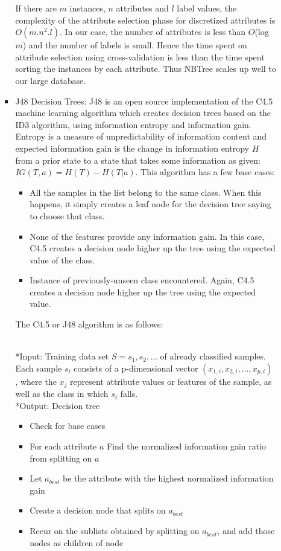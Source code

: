 \begin{itemize}
\begin{enumerate}
\begin{itemize}
If there are $m$ instances, $n$ attributes and $l$ label values, the complexity of the attribute selection phase for discretized attributes is $O(m.n^{2}.l)$. In our case, the number of attributes is less than $O$(log$m$) and the number of labels is small. Hence the time spent on attribute selection using cross-validation is less than the time spent sorting the instances by each attribute. Thus NBTree scales up well to our large database.
\vspace{2.5 mm}
\item{J48 Decision Trees: J48 is an open source implementation of the C4.5 machine learning algorithm which creates decision trees based on the ID3 algorithm, using information entropy and information gain. Entropy is a measure of unpredictability of information content and expected information gain is the change in information entropy $H$ from a prior state to a state that takes some information as given: $IG(T,a) = H(T) - H(T|a)$. This algorithm has a few base cases:
\begin{itemize}
\item{All the samples in the list belong to the same class. When this happens, it simply creates a leaf node for the decision tree saying to choose that class.}
\item{None of the features provide any information gain. In this case, C4.5 creates a decision node higher up the tree using the expected value of the class.}
\item{Instance of previously-unseen class encountered. Again, C4.5 creates a decision node higher up the tree using the expected value.}
\end{itemize} 
The C4.5 or J48 algorithm is as follows:}
\vspace{2.5 mm}
\\*Input: Training data set $S = {s_1, s_2, ...}$ of already classified samples. Each sample  $s_i$ consists of a p-dimensional vector $(x_{1,i}, x_{2,i}, ...,x_{p,i})$ , where the  $x_j$  represent attribute values or features of the sample, as well as the class in which  $s_i$  falls.
\\*Output: Decision tree
\vspace{0.1 mm}
\begin{itemize}
\item{Check for base cases}
\item{For each attribute $a$ Find the normalized information gain ratio from splitting on $a$}
\item{Let $a_{best}$ be the attribute with the highest normalized information gain}
\item{Create a decision node that splits on $a_{best}$}
\item{Recur on the sublists obtained by splitting on $a_{best}$, and add those nodes as children of node}
\end{itemize}


\end{itemize}
\end{enumerate}
\end{itemize}
